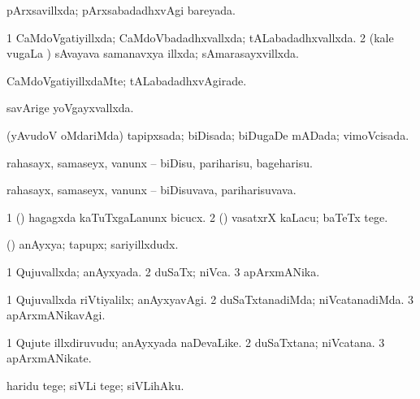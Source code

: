 {{\bentry
{} 
\gl{\gu}
\expl{}
\bmng
pArxsavillxda; pArxsabadadhxvAgi bareyada. 
\emng
\eentry

\bentry
{} 
\gl{\gu}
\expl{}
\bmng
\bnum
\num{1} CaMdoVgatiyillxda; CaMdoVbadadhxvallxda; tALabadadhxvallxda. 
\num{2} (kale \mo vugaLa \vi) sAvayava samanavxya illxda; sAmarasayxvillxda. 
\enum
\emng
\eentry

\bentry
{} 
\gl{\kirxvi}
\expl{}
\bmng
CaMdoVgatiyillxdaMte; tALabadadhxvAgirade. 
\emng
\eentry

\bentry
{} 
\gl{\gu}
\expl{}
\bmng
savArige yoVgayxvallxda. 
\emng
\eentry

\bentry
{} 
\gl{\gu}
\expl{}
\bmng
(yAvudoV oMdariMda) tapipxsada; biDisada; biDugaDe mADada; vimoVcisada. 
\emng
\eentry

\bentry
{} 
\gl{\akirx}
\expl{}
\bmng
rahasayx, samaseyx, \mo vanunx -- biDisu, pariharisu, bageharisu. 
\emng
\eentry

\bentry
{} 
\gl{\nA}
\expl{}
\bmng
rahasayx, samaseyx, \mo vanunx -- biDisuvava, pariharisuvava. 
\emng
\eentry

\bentry
{} 
\gl{\sakirx}
\bmng
\bnum
\num{1} (\nw) hagagxda kaTuTxgaLanunx bicucx. 
\num{2} (\pArxM) vasatxrX kaLacu; baTeTx tege. 
\enum
\emng
\eentry

\bentry
{} 
\gl{\nA}
\expl{}
\bmng
(\pArxparx) anAyxya; tapupx; sariyillxdudx. 
\emng
\eentry

\bentry
{} 
\gl{\gu}
\expl{}
\bmng
\bnum
\num{1} Qujuvallxda; anAyxyada. 
\num{2} duSaTx; niVca. 
\num{3} apArxmANika. 
\enum
\emng
\eentry

\bentry
{} 
\gl{\kirxvi}
\expl{}
\bmng
\bnum
\num{1} Qujuvallxda riVtiyalilx; anAyxyavAgi. 
\num{2} duSaTxtanadiMda; niVcatanadiMda. 
\num{3} apArxmANikavAgi. 
\enum
\emng
\eentry

\bentry
{} 
\gl{\nA}
\expl{}
\bmng
\bnum
\num{1} Qujute illxdiruvudu; anAyxyada naDevaLike. 
\num{2} duSaTxtana; niVcatana. 
\num{3} apArxmANikate. 
\enum
\emng
\eentry

\bentry
{} 
\gl{\akirx}
\bmng
haridu tege; siVLi tege; siVLihAku. 
\emng
\eentry

}}
